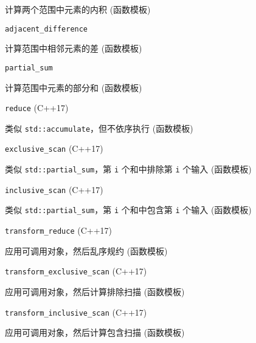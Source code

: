 计算两个范围中元素的内积 (函数模板)

\noindent \lstinline{adjacent_difference}

计算范围中相邻元素的差 (函数模板)

\noindent \lstinline{partial_sum}

计算范围中元素的部分和 (函数模板)

\noindent \lstinline{reduce} (C++17)

类似 \lstinline{std::accumulate}，但不依序执⾏ (函数模板)

\noindent \lstinline{exclusive_scan} (C++17)

类似 \lstinline{std::partial_sum}，第 \lstinline{i} 个和中排除第 \lstinline{i} 个输⼊ (函数模板)

\noindent \lstinline{inclusive_scan} (C++17)

类似 \lstinline{std::partial_sum}，第 \lstinline{i} 个和中包含第 \lstinline{i} 个输⼊ (函数模板)

\noindent \lstinline{transform_reduce} (C++17)

应⽤可调⽤对象，然后乱序规约 (函数模板)

\noindent \lstinline{transform_exclusive_scan} (C++17)

应⽤可调⽤对象，然后计算排除扫描 (函数模板)

\noindent \lstinline{transform_inclusive_scan} (C++17)

应⽤可调⽤对象，然后计算包含扫描 (函数模板)